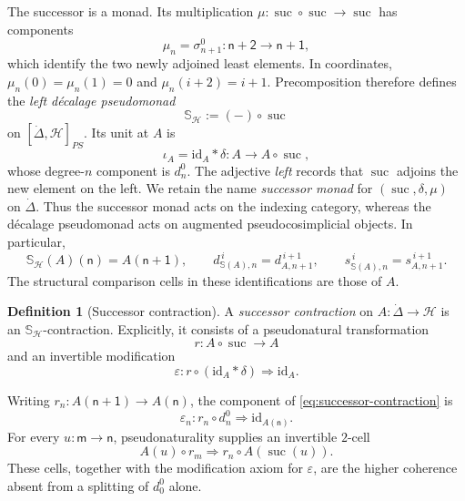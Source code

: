 \documentclass[11pt,a4paper]{article}
\numberwithin{equation}{section}
\theoremstyle{definition}
\newtheorem{definition}[definition]{Definition}
\theoremstyle{remark}
\newcommand{\id}{\mathrm{id}}
\newcommand{\Hcat}{\mathcal H}
\newcommand{\suc}{\operatorname{suc}}
\newcommand{\Smon}{\mathbb S}
\begin{document}
The successor is a monad. Its multiplication
$\mu\colon\suc\circ\suc\to\suc$ has components
\begin{equation}
  \mu_n=\sigma_{n+1}^0\colon
  \mathsf{n+2}\longrightarrow\mathsf{n+1},
  \label{eq:successor-multiplication}
\end{equation}
which identify the two newly adjoined least elements. In coordinates,
$\mu_n(0)=\mu_n(1)=0$ and $\mu_n(i+2)=i+1$.
Precomposition therefore defines the \emph{left d\'ecalage pseudomonad}
\begin{equation}
  \Smon_{\Hcat}:=(-)\circ\suc
  \label{eq:successor-pseudomonad}
\end{equation}
on $[\dot\Delta,\Hcat]_{PS}$. Its unit at $A$ is
\begin{equation}
  \iota_A=\id_A\ast\delta\colon A\longrightarrow A\circ\suc,
  \label{eq:successor-point}
\end{equation}
whose degree-$n$ component is $d_n^0$. The adjective \emph{left}
records that $\suc$ adjoins the new element on the left. We retain the name
\emph{successor monad} for $(\suc,\delta,\mu)$ on
$\dot\Delta$. Thus the successor monad acts on the indexing category,
whereas the d\'ecalage pseudomonad acts on augmented
pseudocosimplicial objects. In particular,
\[
  \Smon_{\Hcat}(A)(\mathsf n)=A(\mathsf{n+1}),
  \qquad
  d_{\Smon(A),n}^{\,i}=d_{A,n+1}^{\,i+1},
  \qquad
  s_{\Smon(A),n}^{\,i}=s_{A,n+1}^{\,i+1}.
\]
The structural comparison cells in these identifications are those
of $A$.

\begin{definition}[Successor contraction]
\label{def:successor-contraction}
A \emph{successor contraction} on
$A\colon\dot\Delta\to\Hcat$ is an $\Smon_{\Hcat}$-contraction.
Explicitly, it consists of a pseudonatural
transformation
\[
  r\colon A\circ\suc\longrightarrow A
\]
and an invertible modification
\begin{equation}
  \varepsilon\colon r\circ(\id_A\ast\delta)\Longrightarrow\id_A.
  \label{eq:successor-contraction}
\end{equation}
\end{definition}

Writing $r_n\colon A(\mathsf{n+1})\to A(\mathsf n)$, the component of
\eqref{eq:successor-contraction} is
\[
  \varepsilon_n\colon r_n\circ d_n^0\Longrightarrow\id_{A(\mathsf n)}.
\]
For every $u\colon\mathsf m\to\mathsf n$, pseudonaturality supplies
an invertible $2$-cell
\begin{equation}
  A(u)\circ r_m\Longrightarrow r_n\circ A(\suc(u)).
  \label{eq:successor-pseudonaturality}
\end{equation}
These cells, together with the modification axiom for
$\varepsilon$, are the higher coherence absent from a splitting of
$d_0^0$ alone.
\end{document}
